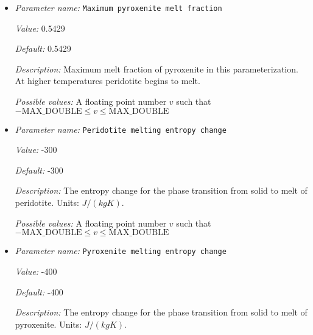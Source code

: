 \begin{itemize}
{\it Value:} 0.15


{\it Default:} 0.15


{\it Description:} Mass fraction of clinopyroxene in the peridotite to be molten. Units: non-dimensional.


{\it Possible values:} A floating point number $v$ such that $-\text{MAX\_DOUBLE} \leq v \leq \text{MAX\_DOUBLE}$
\item {\it Parameter name:} {\tt Maximum pyroxenite melt fraction}
\label{parameters:Material model/Latent heat melt/Maximum pyroxenite melt fraction}


{\it Value:} 0.5429


{\it Default:} 0.5429


{\it Description:} Maximum melt fraction of pyroxenite in this parameterization. At higher temperatures peridotite begins to melt.


{\it Possible values:} A floating point number $v$ such that $-\text{MAX\_DOUBLE} \leq v \leq \text{MAX\_DOUBLE}$
\item {\it Parameter name:} {\tt Peridotite melting entropy change}
\label{parameters:Material model/Latent heat melt/Peridotite melting entropy change}


{\it Value:} -300


{\it Default:} -300


{\it Description:} The entropy change for the phase transition from solid to melt of peridotite. Units: $J/(kg K)$.


{\it Possible values:} A floating point number $v$ such that $-\text{MAX\_DOUBLE} \leq v \leq \text{MAX\_DOUBLE}$
\item {\it Parameter name:} {\tt Pyroxenite melting entropy change}
\label{parameters:Material model/Latent heat melt/Pyroxenite melting entropy change}


{\it Value:} -400


{\it Default:} -400


{\it Description:} The entropy change for the phase transition from solid to melt of pyroxenite. Units: $J/(kg K)$.



\end{itemize}
